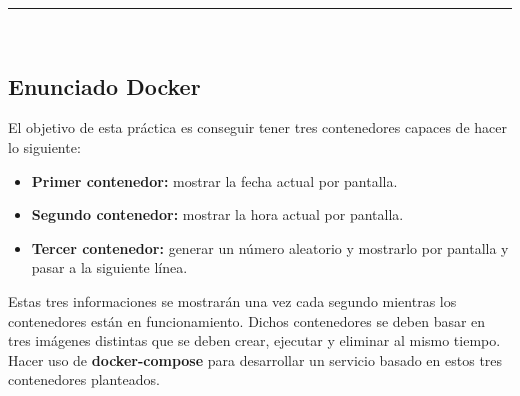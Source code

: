 \newpage
\begin{center}
	{\fboxrule=4pt } \\
	\setcounter{section}{2}
	\setcounter{subsection}{0}
	\rule{15cm}{0pt} \\
\end{center}

\subsection{Enunciado Docker}

\begin{ejer}
    \par El objetivo de esta práctica es conseguir tener tres contenedores capaces de hacer lo siguiente: 
	\begin{itemize}
		\item \textbf{Primer contenedor:} mostrar la fecha actual por pantalla. 
		\item \textbf{Segundo contenedor:} mostrar la hora actual por pantalla. 
		\item \textbf{Tercer contenedor:} generar un número aleatorio y mostrarlo por pantalla y pasar a la siguiente línea.
	\end{itemize}
	\par Estas tres informaciones se mostrarán una vez cada segundo mientras los contenedores están en funcionamiento. 
	Dichos contenedores se deben basar en tres imágenes distintas que se deben crear, ejecutar y eliminar al mismo tiempo. 
	Hacer uso de \textbf{docker-compose} para desarrollar un servicio basado en estos tres contenedores planteados. 
\end{ejer}





